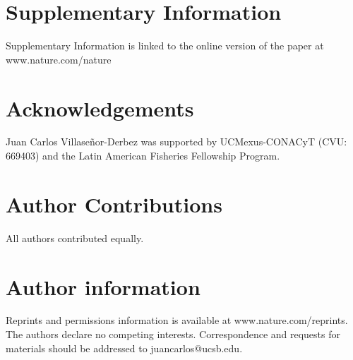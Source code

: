 \documentclass[12pt]{article}
\begin{document}



\section{Supplementary Information}

Supplementary Information is linked to the online version of the paper at www.nature.com/nature

\section{Acknowledgements}

Juan Carlos Villaseñor-Derbez was supported by UCMexus-CONACyT (CVU: 669403) and the Latin American Fisheries Fellowship Program.

\section{Author Contributions}

All authors contributed equally.

\section{Author information}

Reprints and permissions information is available at www.nature.com/reprints. The authors declare no competing interests. Correspondence and requests for materials should be addressed to juancarlos@ucsb.edu.

\clearpage

\FloatBarrier
\end{document}
